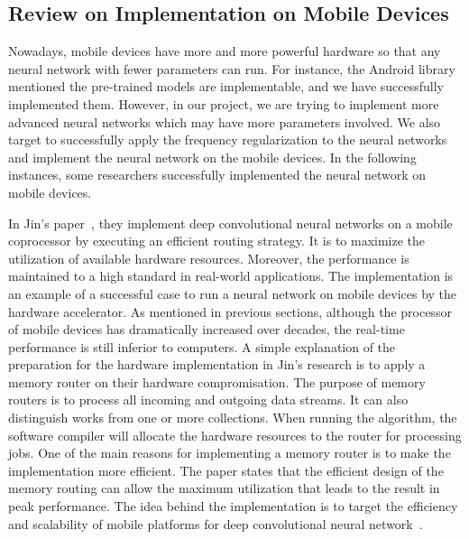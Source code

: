 \documentclass{article}
\begin{document}
\subsection{Review on Implementation on Mobile Devices}

Nowadays, mobile devices have more and more powerful hardware so that any neural network with fewer parameters can run. For instance, the Android library mentioned the pre-trained models are implementable, and we have successfully implemented them. However, in our project, we are trying to implement more advanced neural networks which may have more parameters involved. We also target to successfully apply the frequency regularization to the neural networks and implement the neural network on the mobile devices. In the following instances, some researchers successfully implemented the neural network on mobile devices. 

In Jin's paper~\cite{jin2014implement}, they implement deep convolutional neural networks on a mobile coprocessor by executing an efficient routing strategy. It is to maximize the utilization of available hardware resources. Moreover, the performance is maintained to a high standard in real-world applications. The implementation is an example of a successful case to run a neural network on mobile devices by the hardware accelerator. As mentioned in previous sections, although the processor of mobile devices has dramatically increased over decades, the real-time performance is still inferior to computers. A simple explanation of the preparation for the hardware implementation in Jin's research is to apply a memory router on their hardware compromisation. The purpose of memory routers is to process all incoming and outgoing data streams. It can also distinguish works from one or more collections. When running the algorithm, the software compiler will allocate the hardware resources to the router for processing jobs. One of the main reasons for implementing a memory router is to make the implementation more efficient. The paper states that the efficient design of the memory routing can allow the maximum utilization that leads to the result in peak performance. The idea behind the implementation is to target the efficiency and scalability of mobile platforms for deep convolutional neural network~\cite{jin2014implement}.
\end{document}

